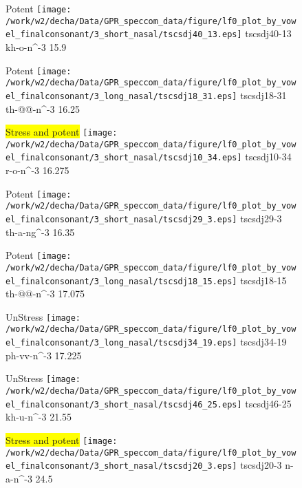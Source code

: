 \documentclass{article}
\begin{document}
\begin{figure}[t]
\begin{minipage}[b]{.24\textwidth}
\colorbox{Apricot}{Potent}
\centering
\texttt{[image: /work/w2/decha/Data/GPR\_speccom\_data/figure/lf0\_plot\_by\_vowel\_finalconsonant/3\_short\_nasal/tscsdj40\_13.eps]}
tscsdj40-13 kh-o-n\textasciicircum-3 15.9
\end{minipage}
\begin{minipage}[b]{.24\textwidth}
\colorbox{Apricot}{Potent}
\centering
\texttt{[image: /work/w2/decha/Data/GPR\_speccom\_data/figure/lf0\_plot\_by\_vowel\_finalconsonant/3\_long\_nasal/tscsdj18\_31.eps]}
tscsdj18-31 th-@@-n\textasciicircum-3 16.25
\end{minipage}
\begin{minipage}[b]{.24\textwidth}
\colorbox{yellow}{Stress and potent}
\centering
\texttt{[image: /work/w2/decha/Data/GPR\_speccom\_data/figure/lf0\_plot\_by\_vowel\_finalconsonant/3\_short\_nasal/tscsdj10\_34.eps]}
tscsdj10-34 r-o-n\textasciicircum-3 16.275
\end{minipage}
\begin{minipage}[b]{.24\textwidth}
\colorbox{Apricot}{Potent}
\centering
\texttt{[image: /work/w2/decha/Data/GPR\_speccom\_data/figure/lf0\_plot\_by\_vowel\_finalconsonant/3\_short\_nasal/tscsdj29\_3.eps]}
tscsdj29-3 th-a-ng\textasciicircum-3 16.35
\end{minipage}
\end{figure}
\clearpage
\begin{figure}[t]
\begin{minipage}[b]{.24\textwidth}
\colorbox{Apricot}{Potent}
\centering
\texttt{[image: /work/w2/decha/Data/GPR\_speccom\_data/figure/lf0\_plot\_by\_vowel\_finalconsonant/3\_long\_nasal/tscsdj18\_15.eps]}
tscsdj18-15 th-@@-n\textasciicircum-3 17.075
\end{minipage}
\begin{minipage}[b]{.24\textwidth}
UnStress
\centering
\texttt{[image: /work/w2/decha/Data/GPR\_speccom\_data/figure/lf0\_plot\_by\_vowel\_finalconsonant/3\_long\_nasal/tscsdj34\_19.eps]}
tscsdj34-19 ph-vv-n\textasciicircum-3 17.225
\end{minipage}
\begin{minipage}[b]{.24\textwidth}
UnStress
\centering
\texttt{[image: /work/w2/decha/Data/GPR\_speccom\_data/figure/lf0\_plot\_by\_vowel\_finalconsonant/3\_short\_nasal/tscsdj46\_25.eps]}
tscsdj46-25 kh-u-n\textasciicircum-3 21.55
\end{minipage}
\begin{minipage}[b]{.24\textwidth}
\colorbox{yellow}{Stress and potent}
\centering
\texttt{[image: /work/w2/decha/Data/GPR\_speccom\_data/figure/lf0\_plot\_by\_vowel\_finalconsonant/3\_short\_nasal/tscsdj20\_3.eps]}
tscsdj20-3 n-a-n\textasciicircum-3 24.5
\end{minipage}
\end{figure}
\end{document}
